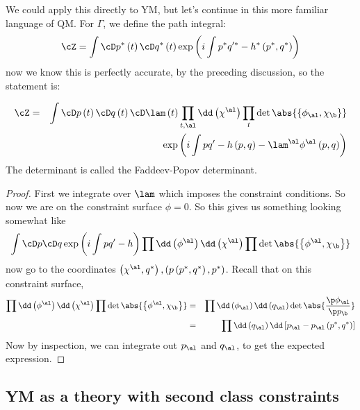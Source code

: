 \documentclass{booc}
\begin{document}
We could apply this directly to YM, but let's continue in this more familiar language of QM. 
For $\Gamma$, we define the path integral:
\begin{equation}
\cZ = \int
\cD p^*\left( t \right) \cD q^*\left( t \right)
\exp\left( 
i\int p^* q'^* - h^*\left( p^* , q^* \right)
\right)
\end{equation}
now we know this is perfectly accurate, by the preceding discussion, so the statement is:

\begin{prop}
\begin{eqnarray}
\cZ &=&  \int \cD p\left( t \right) \cD q\left( t \right)
\cD \lam\left( t \right)
\prod_{t , \al} \dd\left( \chi^\al \right)
\prod_{t} \det \abs{ \left\{ \phi_\al , \chi_\b \right\}}
\\
&& \exp\left( i\int p q' - h\left( p , q \right) - \lam^\al \phi^\al\left( p , q \right) \right)
\end{eqnarray}
The determinant is called the Faddeev-Popov determinant.
\end{prop}

\begin{proof}
First we integrate over $\lam$ which imposes the constraint conditions. 
So now we are on the constraint surface $\phi = 0$.
So this gives us something looking somewhat like
\begin{equation}
\int \cD p \cD q \exp\left( i\int pq' - h \right)
\prod \dd\left( \phi^\al \right) \dd\left( \chi^\al \right)
\prod \det\abs{ \left\{ \phi^\al , \chi_\b \right\}}
\end{equation}
now go to the coordinates
$\left( \chi^\al , q^* \right),
\left( p\left( p^* , q^* \right), p^* \right)$. 
Recall that on this constraint surface, 
\begin{eqnarray}
\prod \dd\left( \phi^\al \right) \dd\left( \chi^\al \right)
\prod \det\abs{ \left\{ \phi^\al , \chi_\b \right\}}
&=& \prod \dd\left( \phi_\al \right)\dd\left( q_\al \right)
\det \abs{\frac{\p\phi_\al}{\p p_\b}}
\\
&=& \prod \dd\left( q_\al \right) \dd\left[ 
p_\al - p_\al\left( p^* , q^* \right)\right]
\end{eqnarray}
Now by inspection, we can integrate out $p_\al$ and $q_\al$, to get the 
expected expression.
\end{proof}

\subsection{YM as a theory with second class constraints}
\end{document}
